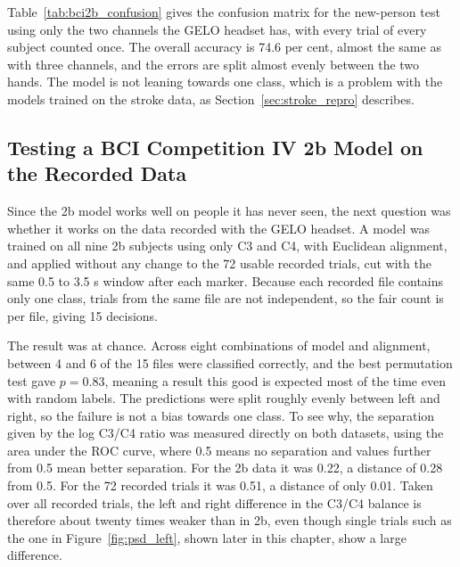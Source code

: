 Table~\ref{tab:bci2b_confusion} gives the confusion matrix for the new-person test using
only the two channels the GELO headset has, with every trial of every subject counted
once. The overall accuracy is 74.6 per cent, almost the same as with three channels, and
the errors are split almost evenly between the two hands. The model is not leaning
towards one class, which is a problem with the models trained on the stroke data, as
Section~\ref{sec:stroke_repro} describes.

\FloatBarrier

\subsection{Testing a BCI Competition IV 2b Model on the Recorded Data}
\label{sec:bci2b_recorded}

Since the 2b model works well on people it has never seen, the next question was whether
it works on the data recorded with the GELO headset. A model was trained on all nine 2b
subjects using only C3 and C4, with Euclidean alignment, and applied without any change
to the 72 usable recorded trials, cut with the same 0.5 to 3.5 s window after each marker.
Because each recorded file contains only one class, trials from the same file are not
independent, so the fair count is per file, giving 15 decisions.

The result was at chance. Across eight combinations of model and alignment, between 4 and
6 of the 15 files were classified correctly, and the best permutation test gave
$p = 0.83$, meaning a result this good is expected most of the time even with random
labels. The predictions were split roughly evenly between left and right, so the failure
is not a bias towards one class. To see why, the separation given by the log C3/C4 ratio
was measured directly on both datasets, using the area under the ROC curve, where 0.5
means no separation and values further from 0.5 mean better separation. For the 2b data
it was 0.22, a distance of 0.28 from 0.5. For the 72 recorded trials it was 0.51, a
distance of only 0.01. Taken over all recorded trials, the left and right difference in
the C3/C4 balance is therefore about twenty times weaker than in 2b, even though single
trials such as the one in Figure~\ref{fig:psd_left}, shown later in this chapter, show a large difference.

